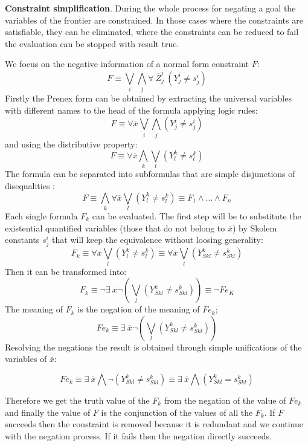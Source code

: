 \documentclass{llncs}
\begin{document}
\noindent
{\bf Constraint simplification}. During the whole process for negating
a goal the variables of the frontier are constrained. In those cases where the
constraints are satisfiable, they can be eliminated, where
the constraints can be reduced to fail the evaluation can be stopped
with result true.
 
We focus on the negative information of a normal form constraint $F$:
\[ F \equiv  \bigvee_i\bigwedge_j \forall~ \overline{Z}_j^i~(Y_j^i \neq s_j^i) \]
Firstly the
Prenex form \cite{Shoenfield} can be obtained by extracting the universal variables with
different names to the head of the formula applying logic rules:
\[ F \equiv \forall \overline{x} \bigvee_i\bigwedge_j (Y_j^i \neq s_j^i) \]
\noindent
and using the distributive property:
\[ F \equiv \forall \overline{x} \bigwedge_k\bigvee_l (Y_l^k \neq s_l^k) \]
The formula can be separated into subformulas that are simple
disjunctions of disequalities :
\[ F \equiv \bigwedge_k \forall \overline{x} \bigvee_l (Y_l^k \neq s_l^k) \equiv F_1 \wedge ... \wedge F_n\]
Each single formula $F_k$ can be evaluated. The first step will
be to substitute the existential quantified variables (those that do
not belong to $\overline{x}$) by Skolem constants $s^i_j$ that will keep the
equivalence without loosing generality:
\[ F_k \equiv \forall \overline{x} \bigvee_l ( Y_l^k \neq s_l^k ) \equiv \forall \overline{x} \bigvee_l ( Y_{Sk l}^k \neq s_{Sk l}^k )  \]
Then it can be transformed into:
\[ F_k \equiv  \neg \exists ~ \overline{x} \neg ( \bigvee_l (Y_{Sk l}^k \neq s_{Sk l}^k) ) \equiv \neg Fe_K \]
The meaning of $F_k$ is the negation of the meaning of $Fe_k$;
\[ Fe_k \equiv \exists ~ \overline{x} \neg ( \bigvee_l (Y_{Sk l}^k \neq s_{Sk l}^k)) \] 
Resolving the negations the result is obtained through simple unifications of the variables of $\overline{x}$:

\[ Fe_k  \equiv \exists ~ \overline{x} \bigwedge \neg (Y_{Sk l}^k \neq s_{Sk l}^k)  \equiv \exists ~ \overline{x} \bigwedge (Y_{Sk l}^k = s_{Sk l}^k)  \]

        Therefore we get the truth value of the $F_k$ from the
        negation of the value of $Fe_k$ and finally the value of $F$ is
        the conjunction of the values of all the $F_k$. If $F$
        succeeds then the constraint is removed because it is redundant
        and we continue with the negation process. If it fails then
        the negation directly succeeds.

\end{document}
